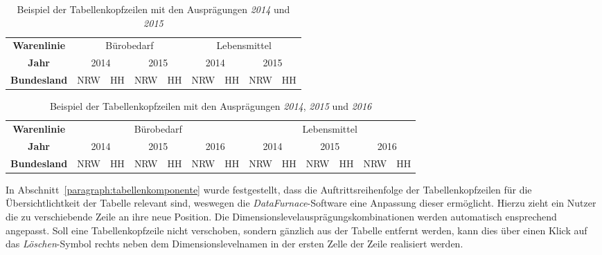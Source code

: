 \documentclass[
  language=german, %
  type=bachelor,%
  ngerman
]{isthesis}
\begin{document}
\begin{content}
    \begin{table}[]
      \footnotesize
      \begin{tabular}{c c c c c c c c c}
        \textbf{Warenlinie} & \multicolumn{4}{c}{Bürobedarf} & \multicolumn{4}{c}{Lebensmittel} \\
            \cmidrule(lr){2-5}\cmidrule(lr){6-9}
        \textbf{Jahr} & \multicolumn{2}{c}{2014} & \multicolumn{2}{c}{2015} & \multicolumn{2}{c}{2014} & \multicolumn{2}{c}{2015}\\
            \cmidrule(lr){2-3}\cmidrule(lr){4-5}\cmidrule(lr){6-7}\cmidrule(lr){8-9}
        \textbf{Bundesland} & NRW & HH & NRW & HH & NRW & HH & NRW & HH \\
      \end{tabular}
      \caption{Beispiel der Tabellenkopfzeilen mit den Ausprägungen \textit{2014} und \textit{2015}}\label{table:berichtstabellenkopf20142015}
    \end{table}

    \begin{table}
      \footnotesize
      \begin{tabular}{c c c c c c c c c c c c c}
        \textbf{Warenlinie} & \multicolumn{6}{c}{Bürobedarf} & \multicolumn{6}{c}{Lebensmittel} \\
            \cmidrule(lr){2-7}\cmidrule(lr){8-13}
        \textbf{Jahr} & \multicolumn{2}{c}{2014} & \multicolumn{2}{c}{2015} & \multicolumn{2}{c}{2016} & \multicolumn{2}{c}{2014} & \multicolumn{2}{c}{2015} & \multicolumn{2}{c}{2016}\\
            \cmidrule(lr){2-3}\cmidrule(lr){4-5}\cmidrule(lr){6-7}\cmidrule(lr){8-9}\cmidrule(lr){10-11}\cmidrule(lr){12-13}
        \textbf{Bundesland} & NRW & HH & NRW & HH & NRW & HH & NRW & HH & NRW & HH & NRW & HH \\
      \end{tabular}
      \caption{Beispiel der Tabellenkopfzeilen mit den Ausprägungen \textit{2014}, \textit{2015} und \textit{2016}}\label{table:berichtstabellenkopf201420152016}
    \end{table}

  In Abschnitt~\ref{paragraph:tabellenkomponente} wurde festgestellt, dass die
  Auftrittsreihenfolge der Tabellenkopfzeilen für die Übersichtlichtkeit der
  Tabelle relevant sind, weswegen die \textit{DataFurnace}-Software eine Anpassung
  dieser ermöglicht. Hierzu zieht ein Nutzer die zu
  verschiebende Zeile an ihre neue Position. Die
  Dimensionslevelausprägungskombinationen werden automatisch ensprechend
  angepasst. Soll eine Tabellenkopfzeile nicht verschoben, sondern gänzlich aus
  der Tabelle entfernt werden, kann dies über einen Klick auf das
  \textit{Löschen}-Symbol rechts neben dem Dimensionslevelnamen in der ersten
  Zelle der Zeile realisiert werden.


\end{content}
\end{document}
